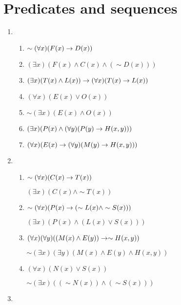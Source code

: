 
\section{Predicates and sequences}

\solutions{}

\begin{enumerate}
  \item %
    \begin{enumerate}[label=(\alph*), align=left]
      \item \(\sim(\forall x)(F(x) \rightarrow D(x))\)
      \item \((\exists x)(F(x) \land C(x) \land (\sim D(x)))\)
      \item \((\exists x)(T(x) \land L(x)) \rightarrow (\forall x)(T(x) \rightarrow L(x))\)
      \item \((\forall x)(E(x) \lor O(x))\)
      \item \(\sim(\exists x)(E(x) \land O(x))\)
      \item \((\exists x)(P(x) \land (\forall y)(P(y) \rightarrow H(x, y)))\)
      \item \((\forall x)(E(x) \rightarrow (\forall y)(M(y) \rightarrow H(x, y)))\)
    \end{enumerate}

  \item %
    \begin{enumerate}
      \item \(\sim(\forall x)(C(x) \rightarrow T(x))\)

            \((\exists x)(C(x) \land \sim T(x))\)

      \item \(\sim(\forall x)(P(x) \rightarrow (\sim L(x) \land \sim S(x)))\)

            \((\exists x)(P(x) \land (L(x) \lor S(x)))\)

      \item \((\forall x)(\forall y)((M(x) \land E(y)) \rightarrow \sim H(x, y))\)

            \(\sim(\exists x)(\exists y)(M(x) \land E(y) \land H(x, y))\)

      \item \((\forall x)(N(x) \lor S(x))\)

            \(\sim (\exists x)((\sim N(x)) \land (\sim S(x)))\)
    \end{enumerate}

  \item %
\end{enumerate}
